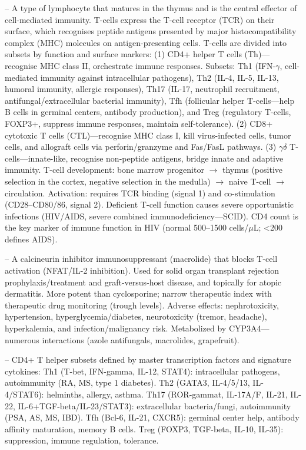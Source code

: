 -- A type of lymphocyte that matures in the thymus and is the central effector of cell-mediated immunity. T-cells express the T-cell receptor (TCR) on their surface, which recognises peptide antigens presented by major histocompatibility complex (MHC) molecules on antigen-presenting cells. T-cells are divided into subsets by function and surface markers: (1) CD4+ helper T cells (Th)—recognise MHC class II, orchestrate immune responses. Subsets: Th1 (IFN-\(\gamma\), cell-mediated immunity against intracellular pathogens), Th2 (IL-4, IL-5, IL-13, humoral immunity, allergic responses), Th17 (IL-17, neutrophil recruitment, antifungal/extracellular bacterial immunity), Tfh (follicular helper T-cells—help B cells in germinal centers, antibody production), and Treg (regulatory T-cells, FOXP3+, suppress immune responses, maintain self-tolerance). (2) CD8+ cytotoxic T cells (CTL)—recognise MHC class I, kill virus-infected cells, tumor cells, and allograft cells via perforin/granzyme and Fas/FasL pathways. (3) \(\gamma\delta\) T-cells—innate-like, recognise non-peptide antigens, bridge innate and adaptive immunity. T-cell development: bone marrow progenitor $\rightarrow$ thymus (positive selection in the cortex, negative selection in the medulla) $\rightarrow$ naive T-cell $\rightarrow$ circulation. Activation: requires TCR binding (signal 1) and co-stimulation (CD28–CD80/86, signal 2). Deficient T-cell function causes severe opportunistic infections (HIV/AIDS, severe combined immunodeficiency—SCID). CD4 count is the key marker of immune function in HIV (normal 500--1500 cells/\(\mu\)L; <200 defines AIDS).

-- A calcineurin inhibitor immunosuppressant (macrolide) that blocks T-cell activation (NFAT/IL-2 inhibition). Used for solid organ transplant rejection prophylaxis/treatment and graft-versus-host disease, and topically for atopic dermatitis. More potent than cyclosporine; narrow therapeutic index with therapeutic drug monitoring (trough levels). Adverse effects: nephrotoxicity, hypertension, hyperglycemia/diabetes, neurotoxicity (tremor, headache), hyperkalemia, and infection/malignancy risk. Metabolized by CYP3A4—numerous interactions (azole antifungals, macrolides, grapefruit).

-- CD4+ T helper subsets defined by master transcription factors and signature cytokines: Th1 (T-bet, IFN-gamma, IL-12, STAT4): intracellular pathogens, autoimmunity (RA, MS, type 1 diabetes). Th2 (GATA3, IL-4/5/13, IL-4/STAT6): helminths, allergy, asthma. Th17 (ROR-gammat, IL-17A/F, IL-21, IL-22, IL-6+TGF-beta/IL-23/STAT3): extracellular bacteria/fungi, autoimmunity (PSA, AS, MS, IBD). Tfh (Bcl-6, IL-21, CXCR5): germinal center help, antibody affinity maturation, memory B cells. Treg (FOXP3, TGF-beta, IL-10, IL-35): suppression, immune regulation, tolerance.

